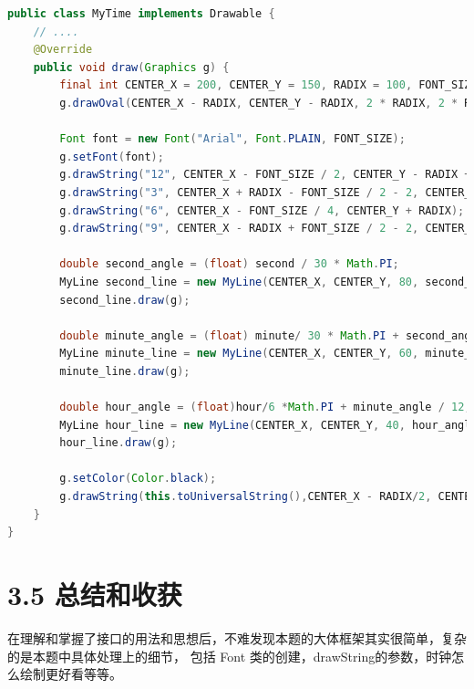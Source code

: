\begin{lstlisting}[language = Java]
public class MyTime implements Drawable {
    // ....
    @Override
    public void draw(Graphics g) {
        final int CENTER_X = 200, CENTER_Y = 150, RADIX = 100, FONT_SIZE = 20;
        g.drawOval(CENTER_X - RADIX, CENTER_Y - RADIX, 2 * RADIX, 2 * RADIX);

        Font font = new Font("Arial", Font.PLAIN, FONT_SIZE);
        g.setFont(font);
        g.drawString("12", CENTER_X - FONT_SIZE / 2, CENTER_Y - RADIX + FONT_SIZE);
        g.drawString("3", CENTER_X + RADIX - FONT_SIZE / 2 - 2, CENTER_Y + FONT_SIZE / 3);
        g.drawString("6", CENTER_X - FONT_SIZE / 4, CENTER_Y + RADIX);
        g.drawString("9", CENTER_X - RADIX + FONT_SIZE / 2 - 2, CENTER_Y + FONT_SIZE / 3);

        double second_angle = (float) second / 30 * Math.PI;
        MyLine second_line = new MyLine(CENTER_X, CENTER_Y, 80, second_angle - Math.PI / 2, Color.red);
        second_line.draw(g);

        double minute_angle = (float) minute/ 30 * Math.PI + second_angle / 60;
        MyLine minute_line = new MyLine(CENTER_X, CENTER_Y, 60, minute_angle - Math.PI / 2, Color.green);
        minute_line.draw(g);

        double hour_angle = (float)hour/6 *Math.PI + minute_angle / 12;
        MyLine hour_line = new MyLine(CENTER_X, CENTER_Y, 40, hour_angle - Math.PI / 2, Color.blue);
        hour_line.draw(g);

        g.setColor(Color.black);
        g.drawString(this.toUniversalString(),CENTER_X - RADIX/2, CENTER_Y - RADIX - FONT_SIZE );
    }
}
\end{lstlisting}

\section{3.5 总结和收获}

在理解和掌握了接口的用法和思想后，不难发现本题的大体框架其实很简单，复杂的是本题中具体处理上的细节，
包括 Font 类的创建，drawString的参数，时钟怎么绘制更好看等等。


